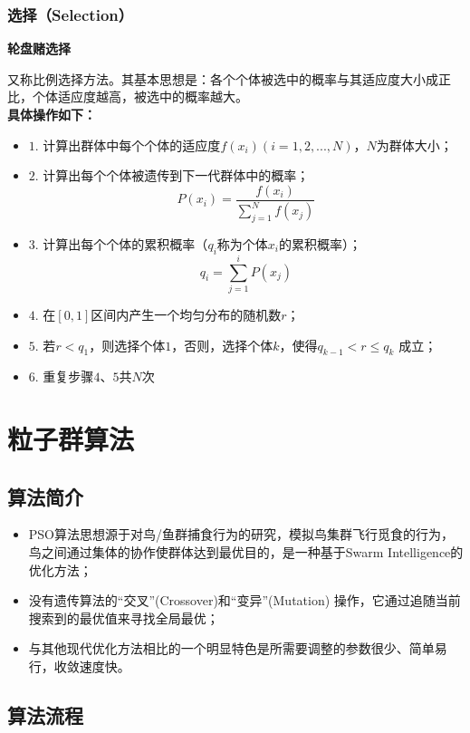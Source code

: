 \documentclass[UTF8]{ctexart}
\begin{document}
\subsubsection{选择（Selection）}

\textbf{轮盘赌选择}

又称比例选择方法。其基本思想是：各个个体被选中的概率与其适应度大小成正比，个体适应度越高，被选中的概率越大。\\

\textbf{具体操作如下：}
\begin{itemize}
    \item $1.$ 计算出群体中每个个体的适应度$f(x_i)(i=1,2,...,N)$，$N$为群体大小；
    \item $2.$ 计算出每个个体被遗传到下一代群体中的概率；
$$P(x_i)=\frac{f(x_i)}{\sum\limits_{j=1}^{N}f(x_j)}$$
    \item $3.$ 计算出每个个体的累积概率（$q_i$称为个体$x_i$的累积概率）；
$$q_i=\sum_{j=1}^{i}P(x_j)$$
    \item $4.$ 在$[0,1]$区间内产生一个均匀分布的随机数$r$；
    \item $5.$ 若$r<q_1$，则选择个体$1$，否则，选择个体$k$，使得$q_{k-1}<r≤q_{k}$ 成立；
    \item $6.$ 重复步骤$4$、$5$共$N$次    
\end{itemize}

\section{粒子群算法}
\subsection{算法简介}
\begin{itemize}
    \item PSO算法思想源于对鸟/鱼群捕食行为的研究，模拟鸟集群飞行觅食的行为，鸟之间通过集体的协作使群体达到最优目的，是一种基于Swarm Intelligence的优化方法；
    \item 没有遗传算法的“交叉”(Crossover)和“变异”(Mutation) 操作，它通过追随当前搜索到的最优值来寻找全局最优；
    \item 与其他现代优化方法相比的一个明显特色是所需要调整的参数很少、简单易行，收敛速度快。    
\end{itemize}

\subsection{算法流程}
\end{document}
